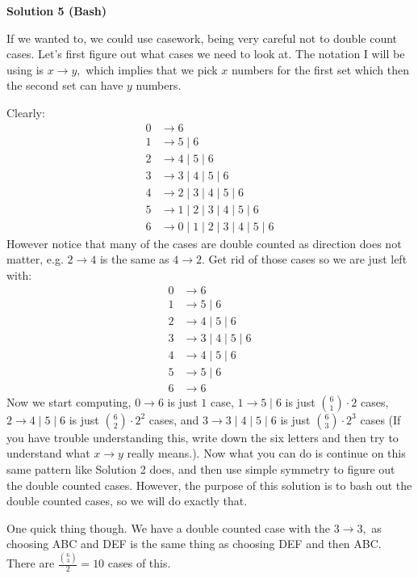 \begin{enumerate}
\textbf{Solution 5 (Bash)}

If we wanted to, we could use casework, being very careful not to double count cases. Let's first figure out what cases we need to look at. The notation I will be using is $x\rightarrow y,$ which implies that we pick $x$ numbers for the first set which then the second set can have $y$ numbers.

 Clearly:
 \begin{align*} 0&\rightarrow6 \\ 1&\rightarrow5\mid6 \\ 2&\rightarrow4\mid5\mid6 \\ 3&\rightarrow3\mid4\mid5\mid6 \\ 4&\rightarrow2\mid3\mid4\mid5\mid6 \\ 5&\rightarrow1\mid2\mid3\mid4\mid5\mid6 \\ 6&\rightarrow0\mid1\mid2\mid3\mid4\mid5\mid6 \end{align*}
However notice that many of the cases are double counted as direction does not matter, e.g. $2\rightarrow4$ is the same as $4\rightarrow2.$ Get rid of those cases so we are just left with:
 \begin{align*} 0&\rightarrow6 \\ 1&\rightarrow5\mid6 \\ 2&\rightarrow4\mid5\mid6 \\ 3&\rightarrow3\mid4\mid5\mid6 \\ 4&\rightarrow4\mid5\mid6 \\ 5&\rightarrow5\mid6 \\ 6&\rightarrow6 \end{align*}
Now we start computing, $0\rightarrow6$ is just $1$ case, $1\rightarrow5\mid6$ is just $\binom{6}{1}\cdot2$ cases, $2\rightarrow4\mid5\mid6$ is just $\binom{6}{2}\cdot2^2$ cases, and $3\rightarrow3\mid4\mid5\mid6$ is just $\binom{6}{3}\cdot2^3$ cases (If you have trouble understanding this, write down the six letters and then try to understand what $x\rightarrow y$ really means.). Now what you can do is continue on this same pattern like Solution 2 does, and then use simple symmetry to figure out the double counted cases. However, the purpose of this solution is to bash out the double counted cases, so we will do exactly that.

 One quick thing though. We have a double counted case with the $3\rightarrow3,$ as choosing ABC and DEF is the same thing as choosing DEF and then ABC. There are $\frac{\binom{6}{3}}{2} = 10$ cases of this.


\end{enumerate}
